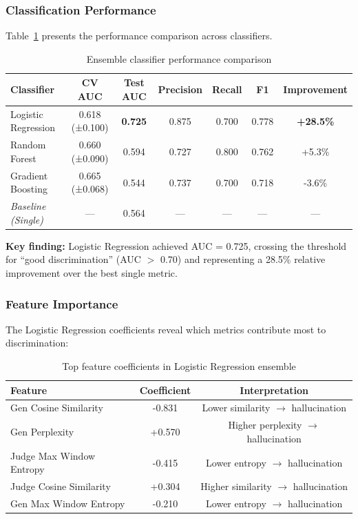 \subsubsection{Classification Performance}

Table~\ref{tab:ensemble_performance} presents the performance comparison across classifiers.

\begin{table}[h]
\centering
\caption{Ensemble classifier performance comparison}
\label{tab:ensemble_performance}
\begin{tabular}{lcccccc}
\toprule
\textbf{Classifier} & \textbf{CV AUC} & \textbf{Test AUC} & \textbf{Precision} & \textbf{Recall} & \textbf{F1} & \textbf{Improvement} \\
\midrule
Logistic Regression & 0.618 (±0.100) & \textbf{0.725} & 0.875 & 0.700 & 0.778 & \textbf{+28.5\%} \\
Random Forest & 0.660 (±0.090) & 0.594 & 0.727 & 0.800 & 0.762 & +5.3\% \\
Gradient Boosting & 0.665 (±0.068) & 0.544 & 0.737 & 0.700 & 0.718 & -3.6\% \\
\midrule
\textit{Baseline (Single)} & --- & 0.564 & --- & --- & --- & --- \\
\bottomrule
\end{tabular}
\end{table}

\textbf{Key finding:} Logistic Regression achieved AUC = 0.725, crossing the threshold for ``good discrimination'' (AUC $>$ 0.70) and representing a 28.5\% relative improvement over the best single metric.

\subsubsection{Feature Importance}

The Logistic Regression coefficients reveal which metrics contribute most to discrimination:

\begin{table}[h]
\centering
\caption{Top feature coefficients in Logistic Regression ensemble}
\label{tab:feature_importance}
\begin{tabular}{lcc}
\toprule
\textbf{Feature} & \textbf{Coefficient} & \textbf{Interpretation} \\
\midrule
Gen Cosine Similarity & -0.831 & Lower similarity $\rightarrow$ hallucination \\
Gen Perplexity & +0.570 & Higher perplexity $\rightarrow$ hallucination \\
Judge Max Window Entropy & -0.415 & Lower entropy $\rightarrow$ hallucination \\
Judge Cosine Similarity & +0.304 & Higher similarity $\rightarrow$ hallucination \\
Gen Max Window Entropy & -0.210 & Lower entropy $\rightarrow$ hallucination \\
\bottomrule
\end{tabular}
\end{table}

